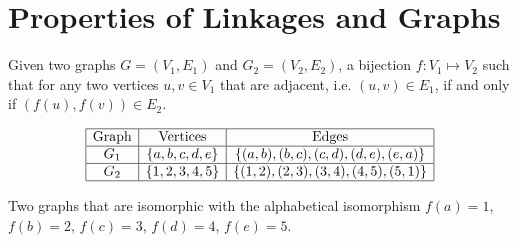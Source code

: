 \section{Properties of Linkages and Graphs}
Given two graphs $G=(V_1,E_1)$ and $G_2 = (V_2,E_2) $, a bijection $f: V_1 \mapsto 
V_2$ 
such that for any two vertices $u,v \in V_1$ that are adjacent, i.e. $(u, v) \in E_1$, if and only 
if $(f(u),f(v)) \in E_2$. 
\begin{table}[!ht]
\begin{center}
$$\begin{array}{|c|c|c|}\hline
\text{Graph}&\text{Vertices}&\text{Edges}\\\hline
G_1&\left\lbrace a,b,c,d,e \right\rbrace & \left\lbrace (a,b),(b,c),(c,d),(d,e),(e,a) \right\rbrace 
\\\hline
G_2&\left\lbrace 1,2,3,4,5 \right\rbrace & \left\lbrace (1,2),(2,3),(3,4),(4,5),(5,1) \right\rbrace 
\\\hline
\end{array} $$
\caption{Two graphs that are isomorphic with the alphabetical isomorphism $f(a)=1$, $f(b)=2$, $f(c) 
= 3$, $f(d)=4$, $f(e)=5$.}
\end{center} 
\label{table:linkages-1}
\end{table} 
